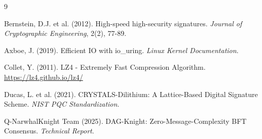 \documentclass[11pt,a4paper]{article}
\begin{document}
\begin{thebibliography}{9}

Bernstein, D.J. et al. (2012). High-speed high-security signatures. \textit{Journal of Cryptographic Engineering}, 2(2), 77-89.

Axboe, J. (2019). Efficient IO with io\_uring. \textit{Linux Kernel Documentation}.

Collet, Y. (2011). LZ4 - Extremely Fast Compression Algorithm. \url{https://lz4.github.io/lz4/}

Ducas, L. et al. (2021). CRYSTALS-Dilithium: A Lattice-Based Digital Signature Scheme. \textit{NIST PQC Standardization}.

Q-NarwhalKnight Team (2025). DAG-Knight: Zero-Message-Complexity BFT Consensus. \textit{Technical Report}.

\end{thebibliography}
\end{document}
